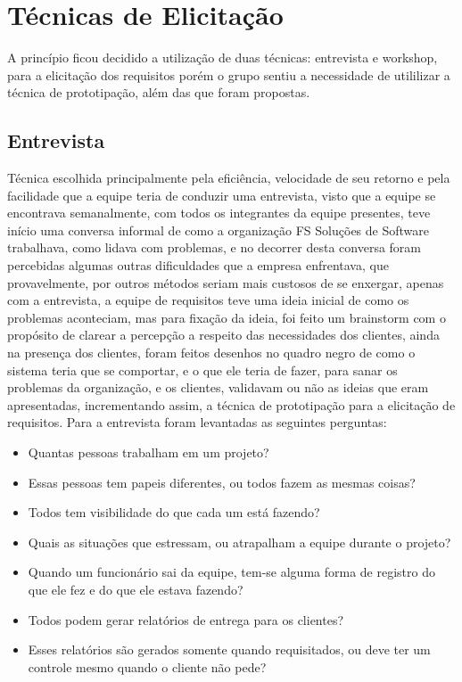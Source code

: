 \section{Técnicas de Elicitação}
A princípio ficou decidido a utilização de duas técnicas: entrevista e workshop, para a elicitação dos requisitos porém o grupo sentiu a necessidade de utililizar a técnica de prototipação, além das que foram propostas.

\subsection{Entrevista}
Técnica escolhida principalmente pela eficiência, velocidade de seu retorno e pela facilidade que a equipe teria de conduzir uma entrevista, visto que a equipe se encontrava semanalmente, com todos os integrantes da equipe presentes, teve início uma conversa informal de como a organização FS Soluções de Software trabalhava, como lidava com problemas, e no decorrer desta conversa foram percebidas algumas outras dificuldades que a empresa enfrentava, que provavelmente, por outros métodos seriam mais custosos de se enxergar, apenas com a entrevista, a equipe de requisitos teve uma ideia inicial de como os problemas aconteciam, mas para fixação da ideia, foi feito um brainstorm com o propósito de clarear a percepção a respeito das necessidades dos clientes, ainda na presença dos clientes, foram feitos desenhos no quadro negro de como o sistema teria que se comportar, e o que ele teria de fazer, para sanar os problemas da organização, e os clientes, validavam ou não as ideias que eram apresentadas, incrementando assim, a técnica de prototipação para a elicitação de requisitos.
Para a entrevista foram levantadas as seguintes perguntas:
\begin{itemize}
\item Quantas pessoas trabalham em um projeto?
\item Essas pessoas tem papeis diferentes, ou todos fazem as mesmas coisas?
\item Todos tem visibilidade do que cada um está fazendo?
\item Quais as situações que estressam, ou atrapalham a equipe durante o projeto?
\item Quando um funcionário sai da equipe, tem-se alguma forma de registro do que ele fez e do que ele estava fazendo?
\item Todos podem gerar relatórios de entrega para os clientes?
\item Esses relatórios são gerados somente quando requisitados, ou deve ter um controle mesmo quando o cliente não pede?
\end{itemize}


